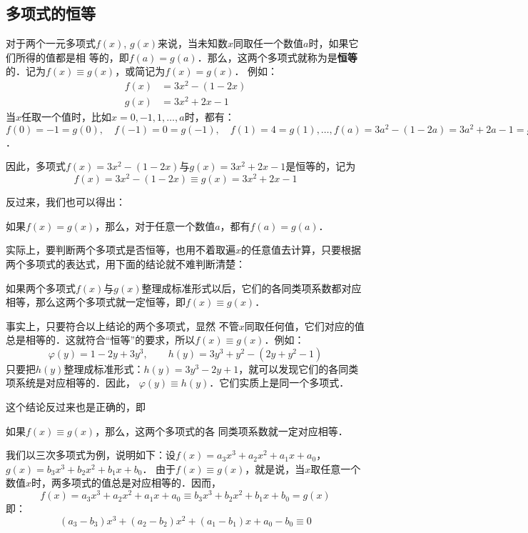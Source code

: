 \subsection{多项式的恒等}

对于两个一元多项式$f(x)$, $g(x)$来说，当未知数$x$同取任一个数值$a$时，如果它们所得的值都是相
等的，即$f(a)=g(a)$．那么，这两个多项式就称为是\textbf{恒等}的．记为$f(x)\equiv g(x)$，或简记为$f(x)=g(x)$．
例如：
\[\begin{split}
    f(x)&=3x^2-(1-2x)\\
g (x) &=3x^2+2x-1
\end{split}\]
当$x$任取一个值时，比如$x=0,-1, 1,\ldots,a$时，都有：$f(0)=-1=g(0),\quad f(-1)=0=g(-1),\quad f(1)=4=g (1), \ldots,f (a) =3a^2- (1-2a) =3a^2+2a-1=g (a)$．

因此，多项式$f(x)=3x^2-(1-2x)$与$g (x) =3x^2+2x-1$是恒等的，记为
\[f(x)=3x^2-(1-2x)\equiv g (x) =3x^2+2x-1 \]

反过来，我们也可以得出：
\begin{blk}{}
    如果$f(x)=g(x)$，那么，对于任意一个数值$a$，都有$f(a)=g(a)$．
\end{blk}

实际上，要判断两个多项式是否恒等，也用不着取遍$x$的任意值去计算，只要根据两个多项式的表达式，用下面的结论就不难判断清楚：

\begin{blk}{}
如果两个多项式$f(x)$与$g(x)$整理成标准形式以后，它们的各同类项系数都对应相等，那么这两个多项式就一定恒等，即$f(x)\equiv g(x)$．
\end{blk}

事实上，只要符合以上结论的两个多项式，显然
不管$x$同取任何值，它们对应的值总是相等的．这就符合“恒等”的要求，所以$f(x)\equiv g(x)$．例如：
\[\varphi(y)=1-2y+3y^3,\qquad h(y)=3y^3+y^2-(2y+y^2-1) \]
只要把$h(y)$整理成标准形式：$h(y)=3y^3-2y+1$，就可以发现它们的各同类项系统是对应相等的．因此，
$\varphi(y)\equiv h(y)$．它们实质上是同一个多项式．

这个结论反过来也是正确的，即

\begin{blk}{}
    如果$f(x)\equiv g(x)$，那么，这两个多项式的各
同类项系数就一定对应相等．
\end{blk}

我们以三次多项式为例，说明如下：设$f(x)=a_3x^3+a_2x^2+a_1x+a_0$，$g(x)=b_3x^3+b_2x^2+b_1x+b_0$．
由于$f(x)\equiv g(x)$，就是说，当$x$取任意一个数值$x$时，两多项式的值总是对应相等的．因而，
\[f(x)=a_3x^3+a_2x^2+a_1x+a_0\equiv b_3x^3+b_2x^2+b_1x+b_0
=g (x) \]
即：\[(a_3-b_3)x^3+(a_2-b_2)x^2+(a_1-b_1)x
+a_0 -b_0\equiv 0\]

